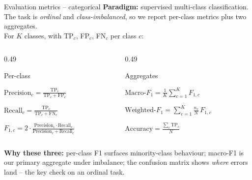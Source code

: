 \begin{frame}{Evaluation metrics -- categorical}
\hypertarget{sub:metrics}{}%
\footnotesize
\textbf{\color{tecdark}Paradigm:} \alert{supervised} multi-class classification. The task is \emph{ordinal} and \emph{class-imbalanced}, so we report per-class metrics plus two aggregates.\\[2pt]
{\scriptsize For $K$ classes, with TP$_c$, FP$_c$, FN$_c$ per class $c$:}
\vspace{2pt}
\begin{columns}[T,onlytextwidth]
\begin{column}{0.49\textwidth}
\begin{block}{Per-class\vphantom{Ag}}
\begin{minipage}[t][2.9cm][s]{\linewidth}
\centering\footnotesize
\vspace*{\fill}
$\displaystyle \text{Precision}_c = \frac{\text{TP}_c}{\text{TP}_c+\text{FP}_c}$\par
\vspace*{\fill}
$\displaystyle \text{Recall}_c = \frac{\text{TP}_c}{\text{TP}_c+\text{FN}_c}$\par
\vspace*{\fill}
$\displaystyle F_{1,c} = 2\cdot\frac{\text{Precision}_c \cdot \text{Recall}_c}{\text{Precision}_c + \text{Recall}_c}$\par
\vspace*{\fill}
\end{minipage}
\end{block}
\end{column}
\hspace{0.02\textwidth}
\begin{column}{0.49\textwidth}
\begin{block}{Aggregates\vphantom{Ag}}
\begin{minipage}[t][2.9cm][s]{\linewidth}
\centering\footnotesize
\vspace*{\fill}
$\displaystyle \text{Macro-}F_1 = \frac{1}{K}\sum_{c=1}^{K} F_{1,c}$\par
\vspace*{\fill}
$\displaystyle \text{Weighted-}F_1 = \sum_{c=1}^{K}\frac{n_c}{N}\,F_{1,c}$\par
\vspace*{\fill}
$\displaystyle \text{Accuracy} = \frac{\sum_c \text{TP}_c}{N}$\par
\vspace*{\fill}
\end{minipage}
\end{block}
\end{column}
\end{columns}
\vspace{3pt}
\begin{infoBox}\scriptsize
\textbf{Why these three:} per-class F1 surfaces minority-class behaviour; \alert{macro-F1} is our primary aggregate under imbalance; the \alert{confusion matrix} shows \emph{where} errors land -- the key check on an ordinal task.
\end{infoBox}
\end{frame}

